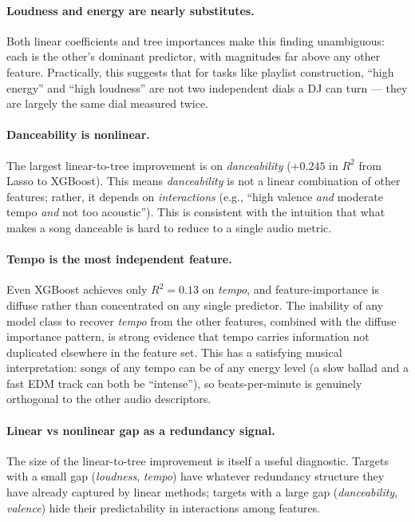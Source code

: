\documentclass[11pt]{article}
\begin{document}
\paragraph{Loudness and energy are nearly substitutes.} Both linear coefficients and tree importances make this finding unambiguous: each is the other's dominant predictor, with magnitudes far above any other feature. Practically, this suggests that for tasks like playlist construction, ``high energy'' and ``high loudness'' are not two independent dials a DJ can turn --- they are largely the same dial measured twice.

\paragraph{Danceability is nonlinear.} The largest linear-to-tree improvement is on \emph{danceability} ($+0.245$ in $R^2$ from Lasso to XGBoost). This means \emph{danceability} is not a linear combination of other features; rather, it depends on \emph{interactions} (e.g., ``high valence \emph{and} moderate tempo \emph{and} not too acoustic''). This is consistent with the intuition that what makes a song danceable is hard to reduce to a single audio metric.

\paragraph{Tempo is the most independent feature.} Even XGBoost achieves only $R^2 = 0.13$ on \emph{tempo}, and feature-importance is diffuse rather than concentrated on any single predictor. The inability of any model class to recover \emph{tempo} from the other features, combined with the diffuse importance pattern, is strong evidence that tempo carries information not duplicated elsewhere in the feature set. This has a satisfying musical interpretation: songs of any tempo can be of any energy level (a slow ballad and a fast EDM track can both be ``intense''), so beats-per-minute is genuinely orthogonal to the other audio descriptors.

\paragraph{Linear vs nonlinear gap as a redundancy signal.} The size of the linear-to-tree improvement is itself a useful diagnostic. Targets with a small gap (\emph{loudness}, \emph{tempo}) have whatever redundancy structure they have already captured by linear methods; targets with a large gap (\emph{danceability}, \emph{valence}) hide their predictability in interactions among features.
\end{document}
